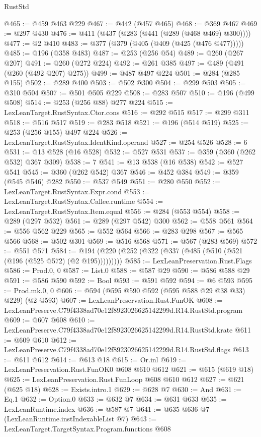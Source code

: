 \begin{lexlean}{RustStd}
\begin{coremodule}
@465 := @459 @463 @229
@467 := @442 (@457 @465)
@468 := @369 @467
@469 := @297 @430
@476 := @411 (@437 (@283 (@441 (@289 (@468 @469) @300))))
@477 := @2 @410
@483 := @377 (@379 (@405 (@409 (@425 (@476 @477)))))
@485 := @196 (@358 @483)
@487 := @253 (@256 @54)
@489 := @260 (@267 @207)
@491 := @260 (@272 @224)
@492 := @261 @385
@497 := @489 (@491 (@260 (@492 @207) @275))
@499 := @487 @497 @224
@501 := @284 (@285 @155)
@502 := @289 @400
@503 := @502 @300
@504 := @299 @503
@505 := @310 @504
@507 := @501 @505 @229
@508 := @283 @507
@510 := @196 (@499 @508)
@514 := @253 (@256 @88) @277 @224
@515 := LexLeanTarget.RustSyntax.Ctor.cons
@516 := @292 @515
@517 := @299 @311
@518 := @516 @517
@519 := @283 @518
@521 := @196 (@514 @519)
@525 := @253 (@256 @155) @497 @224
@526 := LexLeanTarget.RustSyntax.IdentKind.operand
@527 := @254 @526
@528 := 6
@531 := @13 @528 (@16 @528)
@532 := @527 @531
@537 := @359 (@360 (@262 @532) @367 @309)
@538 := 7
@541 := @13 @538 (@16 @538)
@542 := @527 @541
@545 := @360 (@262 @542) @367
@546 := @452 @384
@549 := @359 (@545 @546) @282
@550 := @537 @549
@551 := @280 @550
@552 := LexLeanTarget.RustSyntax.Expr.cond
@553 := LexLeanTarget.RustSyntax.Callee.runtime
@554 := LexLeanTarget.RustSyntax.Item.equal
@556 := @284 (@553 @554)
@558 := @289 (@297 @532)
@561 := @289 (@297 @542) @300
@562 := @558 @561
@564 := @556 @562 @229
@565 := @552 @564
@566 := @283 @298
@567 := @565 @566
@568 := @502 @301
@569 := @516 @568
@571 := @567 (@283 @569)
@572 := @551 @571
@584 := @194 (@220 (@252 (@322 (@337 (@485 (@510 (@521 (@196 (@525 @572) (@2 @195)))))))))
@585 := LexLeanPreservation.Rust.Flags
@586 := Prod.{0, 0}
@587 := List.{0}
@588 := @587 @29
@590 := @586 @588 @29
@591 := @586 @590
@592 := Bool
@593 := @591 @592
@594 := @6 @593
@595 := Prod.mk.{0, 0}
@606 := @594 (@595 @590 @592 (@595 @588 @29 @38 @33) @229) (@2 @593)
@607 := LexLeanPreservation.Rust.FunOK
@608 := LexLeanPreserve.C79f4338ad70e12f8923026625142299d.R14.RustStd.program
@609 := @607 @608
@610 := LexLeanPreserve.C79f4338ad70e12f8923026625142299d.R14.RustStd.krate
@611 := @609 @610
@612 := LexLeanPreserve.C79f4338ad70e12f8923026625142299d.R14.RustStd.flags
@613 := @611 @612
@614 := @613 @18
@615 := Or.inl
@619 := LexLeanPreservation.Rust.FunOK0 @608 @610 @612
@621 := @615 (@619 @18)
@625 := LexLeanPreservation.Rust.FunLoop @608 @610 @612
@627 := @621 (@625 @18)
@628 := Exists.intro.{1}
@629 := @628 @7
@630 := And
@631 := Eq.{1}
@632 := Option.{0}
@633 := @632 @7
@634 := @631 @633
@635 := LexLeanRuntime.index
@636 := @587 @7
@641 := @635 @636 @7 (LexLeanRuntime.instIndexableList @7)
@643 := LexLeanTarget.TargetSyntax.Program.functions @608

\end{coremodule}
\end{lexlean}
